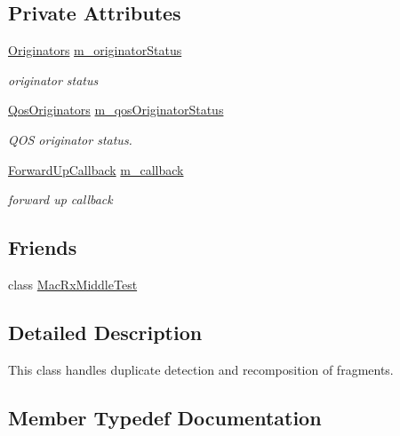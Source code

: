 \subsection*{Private Attributes}
\begin{DoxyCompactItemize}
\item 
\hyperlink{classns3_1_1MacRxMiddle_a6263189b2a22e164f77f0a9d58d035cc}{Originators} \hyperlink{classns3_1_1MacRxMiddle_a1938c454885267867365a04ae45a1fcb}{m\+\_\+originator\+Status}
\begin{DoxyCompactList}\small\item\em originator status \end{DoxyCompactList}\item 
\hyperlink{classns3_1_1MacRxMiddle_a77bf81590cbfd7edc9557dbf4621150b}{Qos\+Originators} \hyperlink{classns3_1_1MacRxMiddle_a80a0db4db3281d8bffc08cf5f989ab6e}{m\+\_\+qos\+Originator\+Status}
\begin{DoxyCompactList}\small\item\em Q\+OS originator status. \end{DoxyCompactList}\item 
\hyperlink{classns3_1_1MacRxMiddle_ad1a3ee168f7826b71385af2cec382c81}{Forward\+Up\+Callback} \hyperlink{classns3_1_1MacRxMiddle_aba181a02e2199e5d4093d9ce51646f94}{m\+\_\+callback}
\begin{DoxyCompactList}\small\item\em forward up callback \end{DoxyCompactList}\end{DoxyCompactItemize}
\subsection*{Friends}
\begin{DoxyCompactItemize}
\item 
class \hyperlink{classns3_1_1MacRxMiddle_a02ab2c173942e033b1552bdf29bd2e96}{Mac\+Rx\+Middle\+Test}
\end{DoxyCompactItemize}


\subsection{Detailed Description}
This class handles duplicate detection and recomposition of fragments. 

\subsection{Member Typedef Documentation}
